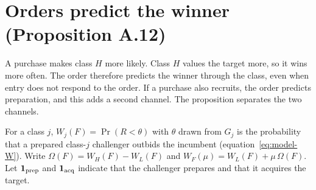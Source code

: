 \section{Orders predict the winner (Proposition A.12)}\label{sec:empirical-winner}

A purchase makes class \(H\) more likely. Class \(H\) values the target more, so it wins more often. The order therefore predicts the winner through the class, even when entry does not respond to the order. If a purchase also recruits, the order predicts preparation, and this adds a second channel. The proposition separates the two channels.

For a class \(j\), \(W_j(F)=\Pr(R<\theta)\) with \(\theta\) drawn from \(G_j\) is the probability that a prepared class-\(j\) challenger outbids the incumbent (equation~\eqref{eq:model-W}). Write \(\Omega(F)=W_H(F)-W_L(F)\) and \(W_F(\mu)=W_L(F)+\mu\,\Omega(F)\). Let \(\mathbf{1}_{\rm prep}\) and \(\mathbf{1}_{\rm acq}\) indicate that the challenger prepares and that it acquires the target.

